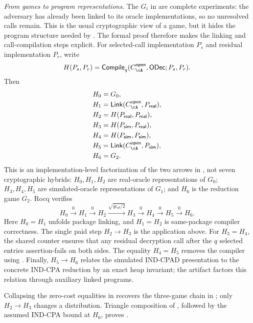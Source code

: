 \smallskip\noindent\emph{From games to program representations.}
The \(G_i\) in  are complete experiments: the
adversary has already been linked to its oracle implementations, so no
unresolved calls remain.
This is the usual cryptographic view of a game, but it hides the program
structure needed by .
The formal proof therefore makes the linking and call-compilation steps
explicit.
For selected-call implementation \(P_s\) and residual implementation \(P_r\),
write
\[
 H(P_s,P_r)=
 \mathsf{Compile}_{q}
   (C_{\cA}^{\mathsf{open}},\mathsf{ODec};P_s,P_r).
\]
Then
\begin{align*}
 H_0 &= G_0,\\
 H_1 &= \mathsf{Link}(C_{\cA}^{\mathsf{open}},P_{\mathsf{real}}),\\
 H_2 &= H(P_{\mathsf{real}},P_{\mathsf{real}}),\\
 H_3 &= H(P_{\mathsf{sim}},P_{\mathsf{real}}),\\
 H_4 &= H(P_{\mathsf{sim}},P_{\mathsf{sim}}),\\
 H_5 &= \mathsf{Link}(C_{\cA}^{\mathsf{open}},P_{\mathsf{sim}}),\\
 H_6 &= G_2.
\end{align*}
This is an implementation-level factorization of the two arrows in
, not seven cryptographic hybrids:
\(H_0,H_1,H_2\) are real-oracle representations of \(G_0\);
\(H_3,H_4,H_5\) are simulated-oracle representations of \(G_1\); and
\(H_6\) is the reduction game \(G_2\).
Rocq verifies
\begin{equation}
\label{eq:hybrid-chain}
 H_0\xrightarrow{0}H_1\xrightarrow{0}H_2
 \xrightarrow{\sqrt{q\epsilon_{\mathsf{nf}}/2}}H_3
 \xrightarrow{0}H_4\xrightarrow{0}H_5\xrightarrow{0}H_6.
\end{equation}
Here \(H_0=H_1\) unfolds package linking, and \(H_1=H_2\) is same-package
compiler correctness.
The single paid step \(H_2\to H_3\) is the application above.
For \(H_3=H_4\), the shared counter ensures that any residual decryption call
after the \(q\) selected entries assertion-fails on both sides.
The equality \(H_4=H_5\) removes the compiler using
.
Finally, \(H_5\to H_6\) relates the simulated IND-CPAD presentation to the
concrete IND-CPA reduction by an exact heap invariant; the artifact factors
this relation through auxiliary linked programs.

Collapsing the zero-cost equalities in  recovers the
three-game chain in ; only \(H_2\to H_3\)
changes a distribution.
Triangle composition of , followed by the assumed
IND-CPA bound at \(H_6\), proves .
